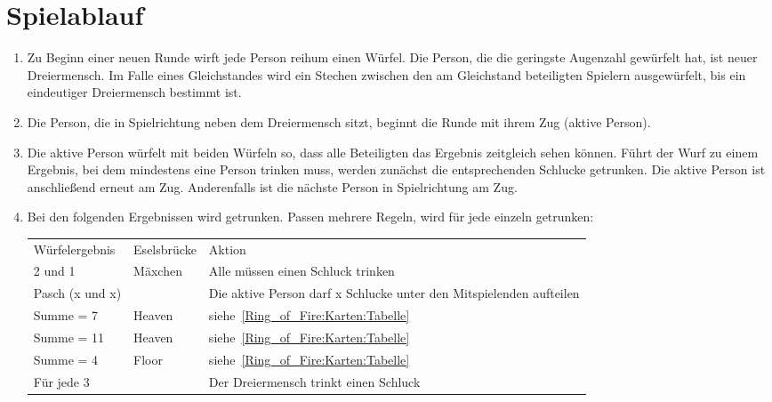 \section{Spielablauf}
\begin{enumerate}[label={(\arabic*)}]
	\item\label{Dreiermensch:Spielablauf:NeueRunde}
	Zu Beginn einer neuen Runde wirft jede Person reihum einen Würfel.
	Die Person, die die geringste Augenzahl gewürfelt hat, ist neuer Dreiermensch.
	Im Falle eines Gleichstandes wird ein Stechen zwischen den am Gleichstand beteiligten Spielern ausgewürfelt, bis ein eindeutiger Dreiermensch bestimmt ist.
	
	\item
	Die Person, die in Spielrichtung neben dem Dreiermensch sitzt, beginnt die Runde mit ihrem Zug (\glqq{}aktive Person\grqq{}).
	
	\item
	Die aktive Person würfelt mit beiden Würfeln so, dass alle Beteiligten das Ergebnis zeitgleich sehen können.
	Führt der Wurf zu einem Ergebnis, bei dem mindestens eine Person trinken muss, werden zunächst die entsprechenden Schlucke getrunken.
	Die aktive Person ist anschließend erneut am Zug.
	Anderenfalls ist die nächste Person in Spielrichtung am Zug.
	
	\item
	Bei den folgenden Ergebnissen wird getrunken. 
	Passen mehrere Regeln, wird für jede einzeln getrunken:
	
	\begin{tabulary}{0.92\textwidth}{llL}
		\toprule
		Würfelergebnis   & Eselsbrücke & Aktion \\
		2 und 1          & Mäxchen & Alle müssen einen Schluck trinken \\
		Pasch (x und x)  &         & Die aktive Person darf x Schlucke unter den Mitspielenden aufteilen \\
		Summe = 7        & Heaven  & siehe~\ref{Ring_of_Fire:Karten:Tabelle} \\
		Summe = 11       & Heaven  & siehe~\ref{Ring_of_Fire:Karten:Tabelle} \\
		Summe = 4        & Floor   & siehe~\ref{Ring_of_Fire:Karten:Tabelle} \\
		Für jede 3 &         &Der Dreiermensch trinkt einen Schluck \\\bottomrule
	\end{tabulary}\\


\end{enumerate}
